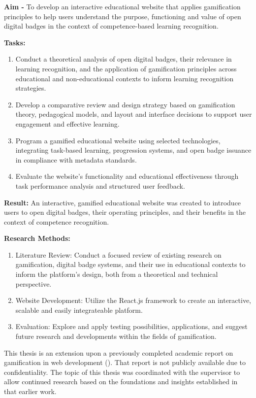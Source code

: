\textbf{Aim -} To develop an interactive educational website that applies gamification principles to help users understand the purpose, functioning and value of open digital badges in the context of competence-based learning recognition.

\textbf{Tasks:} 
\begin{enumerate}
  \addtolength{\itemsep}{-0.5\baselineskip} 
  \item Conduct a theoretical analysis of open digital badges, their relevance in learning recognition, and the application of gamification principles across educational and non-educational contexts to inform learning recognition strategies.
  \item Develop a comparative review and design strategy based on gamification theory, pedagogical models, and layout and interface decisions to support user engagement and effective learning.
  \item Program a gamified educational website using selected technologies, integrating task-based learning, progression systems, and open badge issuance in compliance with metadata standards.
  \item Evaluate the website’s functionality and educational effectiveness through task performance analysis and structured user feedback.
\end{enumerate}

\textbf{Result:} An interactive, gamified educational website was created to introduce users to open digital badges, their operating principles, and their benefits in the context of competence recognition.

\textbf{Research Methods:}
\begin{enumerate}
  \addtolength{\itemsep}{-0.5\baselineskip} 
  \item Literature Review: Conduct a focused review of existing research on gamification, digital badge systems, and their use in educational contexts to inform the platform's design, both from a theoretical and technical perspective.
  \item Website Development: Utilize the React.js framework to create an interactive, scalable and easily integrateable platform.
  \item Evaluation: Explore and apply testing possibilities, applications, and suggest future research and developments within the fields of gamification.
\end{enumerate}

This thesis is an extension upon a previously completed academic report on gamification in web development (\cite{me2024}). 
That report is not publicly available due to confidentiality. 
The topic of this thesis was coordinated with the supervisor to allow continued research based on the foundations and insights established in that earlier work.
\newpage